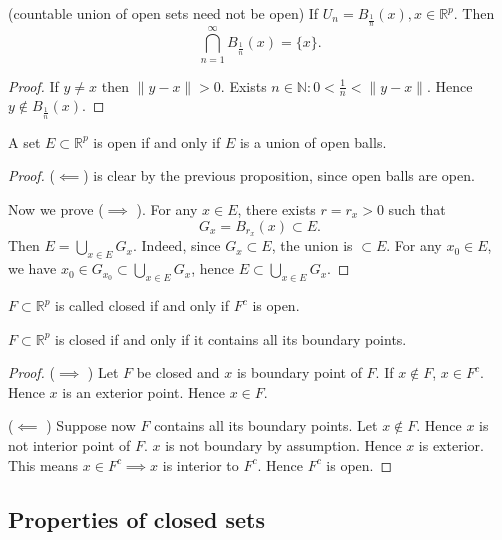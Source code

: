
\begin{example}
	(countable union of open sets need not be open)
	If $U_n = B_{\frac{1}{n}}(x), x \in \mathbb{R}^p$. Then \[
		\bigcap_{n = 1}^\infty  B_{\frac{1}{n}}(x) = \{x\} 
	.\] 
	\begin{proof}
		If $y \neq x$ then $\|y-x\| >0$. Exists $n \in \mathbb{N}: 0 < \frac{1}{n} < \|y-x\|$. Hence $y \not\in B_{\frac{1}{n}}(x)$.
	\end{proof}
\end{example}

\begin{proposition}
	A set $E \subset \mathbb{R}^p$ is open if and only if $E$ is a union of open balls.
\end{proposition}
\begin{proof}
	($\impliedby$) is clear by the previous proposition, since open balls are open.

	Now we prove ($\implies$ ). For any $x \in E$, there exists $r = r_x > 0$ such that \[
		G_x = B_{r_x}(x) \subset E
	.\] 
	Then $E = \bigcup_{x \in E} G_x$. Indeed, since $G_x \subset E$, the union is $\subset E$. For any $x_0 \in E$, we have $x_0 \in G_{x_0} \subset \bigcup_{x \in E} G_x$, hence $E \subset \bigcup_{x \in E} G_x$.
\end{proof}

\begin{definition}
	$F \subset \mathbb{R}^p$ is called closed if and only if $F^c$ is open.
\end{definition}

\begin{proposition}
	$F \subset \mathbb{R}^p$ is closed if and only if it contains all its boundary points.
\end{proposition}
\begin{proof}
	($\implies$ ) Let $F$ be closed and $x$ is boundary point of $F$. If $x \not\in F$, $x \in F^c$. Hence $x$ is an exterior point. Hence $x \in F$.
	
	($\impliedby$ ) Suppose now $F$ contains all its boundary points. Let $x \not\in F$. Hence $x$ is not interior point of $F$. $x$ is not boundary by assumption. Hence $x$ is exterior. This means $x \in F^c \implies x $ is interior to $F^c$. Hence $F^c$ is open.
\end{proof}

\subsection{Properties of closed sets}

